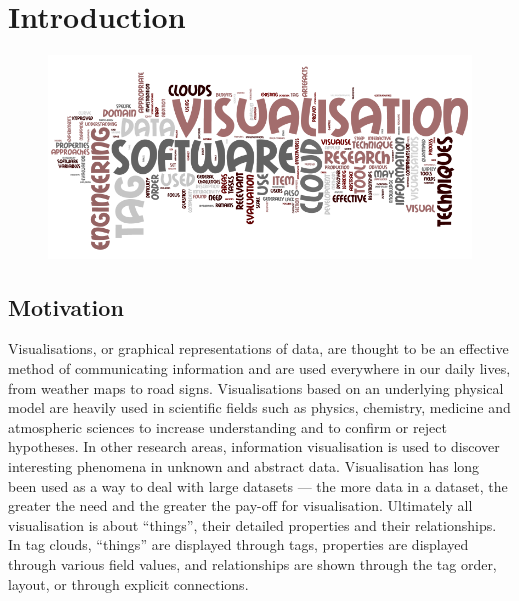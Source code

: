 \chapter{Introduction}
\ifpdf
    \graphicspath{{Chapters/Introduction/IntroductionFigs/PNG/}{Chapters/Introduction/IntroductionFigs/PDF/}{Chapters/Introduction/IntroductionFigs/}}
\else
    \graphicspath{{Chapters/Introduction/IntroductionFigs/EPS/}{Chapters/Introduction/IntroductionFigs/}}
\fi

\begin{figure}[htb]
   	\centering
   	\includegraphics[scale=0.55]{tagcloud.png}
	\label{fig:tagcloud}	
\end{figure}

\section{Motivation}

Visualisations, or graphical representations of data, are thought to be an effective method of communicating information and are used everywhere in our daily lives, from weather maps to road signs. Visualisations based on an underlying physical model are heavily used in scientific fields such as physics, chemistry, medicine and atmospheric sciences to increase understanding and to confirm or reject hypotheses. In other research areas, information visualisation is used to discover interesting phenomena in unknown and abstract data. Visualisation has long been used as a way to deal with large datasets --- the more data in a dataset, the greater the need and the greater the pay-off for visualisation. Ultimately all visualisation is about ``things'', their detailed properties and their relationships. In tag clouds, ``things'' are displayed through tags, properties are displayed through various field values, and relationships are shown through the tag order, layout, or through explicit connections.

